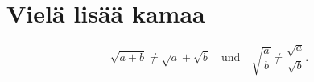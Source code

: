 
\chapter{Vielä lisää kamaa}


\begin{equation}
\sqrt{a+b}\ne\sqrt{a}+\sqrt{b}\quad
\mbox{und}
\quad\sqrt{\frac{a}{b}}\ne\frac{\sqrt{a}}{\sqrt{b}}.
\end{equation}







